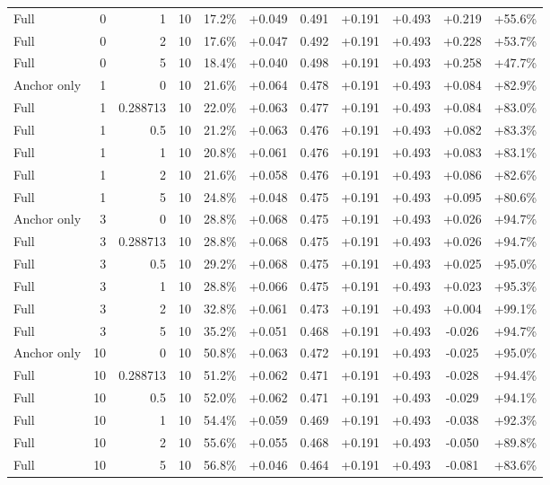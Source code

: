 \begin{table}[htbp]
\begin{tabular}{lrrrccccccc}
Full & 0 & 1 & 10 & 17.2\% & +0.049 & 0.491 & +0.191 & +0.493 & +0.219 & +55.6\% \\
Full & 0 & 2 & 10 & 17.6\% & +0.047 & 0.492 & +0.191 & +0.493 & +0.228 & +53.7\% \\
Full & 0 & 5 & 10 & 18.4\% & +0.040 & 0.498 & +0.191 & +0.493 & +0.258 & +47.7\% \\
Anchor only & 1 & 0 & 10 & 21.6\% & +0.064 & 0.478 & +0.191 & +0.493 & +0.084 & +82.9\% \\
Full & 1 & 0.288713 & 10 & 22.0\% & +0.063 & 0.477 & +0.191 & +0.493 & +0.084 & +83.0\% \\
Full & 1 & 0.5 & 10 & 21.2\% & +0.063 & 0.476 & +0.191 & +0.493 & +0.082 & +83.3\% \\
Full & 1 & 1 & 10 & 20.8\% & +0.061 & 0.476 & +0.191 & +0.493 & +0.083 & +83.1\% \\
Full & 1 & 2 & 10 & 21.6\% & +0.058 & 0.476 & +0.191 & +0.493 & +0.086 & +82.6\% \\
Full & 1 & 5 & 10 & 24.8\% & +0.048 & 0.475 & +0.191 & +0.493 & +0.095 & +80.6\% \\
Anchor only & 3 & 0 & 10 & 28.8\% & +0.068 & 0.475 & +0.191 & +0.493 & +0.026 & +94.7\% \\
Full & 3 & 0.288713 & 10 & 28.8\% & +0.068 & 0.475 & +0.191 & +0.493 & +0.026 & +94.7\% \\
Full & 3 & 0.5 & 10 & 29.2\% & +0.068 & 0.475 & +0.191 & +0.493 & +0.025 & +95.0\% \\
Full & 3 & 1 & 10 & 28.8\% & +0.066 & 0.475 & +0.191 & +0.493 & +0.023 & +95.3\% \\
Full & 3 & 2 & 10 & 32.8\% & +0.061 & 0.473 & +0.191 & +0.493 & +0.004 & +99.1\% \\
Full & 3 & 5 & 10 & 35.2\% & +0.051 & 0.468 & +0.191 & +0.493 & -0.026 & +94.7\% \\
Anchor only & 10 & 0 & 10 & 50.8\% & +0.063 & 0.472 & +0.191 & +0.493 & -0.025 & +95.0\% \\
Full & 10 & 0.288713 & 10 & 51.2\% & +0.062 & 0.471 & +0.191 & +0.493 & -0.028 & +94.4\% \\
Full & 10 & 0.5 & 10 & 52.0\% & +0.062 & 0.471 & +0.191 & +0.493 & -0.029 & +94.1\% \\
Full & 10 & 1 & 10 & 54.4\% & +0.059 & 0.469 & +0.191 & +0.493 & -0.038 & +92.3\% \\
Full & 10 & 2 & 10 & 55.6\% & +0.055 & 0.468 & +0.191 & +0.493 & -0.050 & +89.8\% \\
Full & 10 & 5 & 10 & 56.8\% & +0.046 & 0.464 & +0.191 & +0.493 & -0.081 & +83.6\% \\

\end{tabular}
\end{table}
